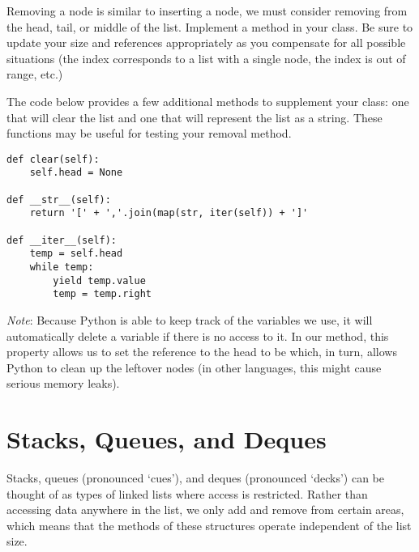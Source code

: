 \begin{problem}
Removing a node is similar to inserting a node, we must consider removing from the head, tail, or middle of the list.
Implement a  method in your  class.
Be sure to update your size and references appropriately as you compensate for all possible situations (the index corresponds to a list with a single node, the index is out of range, etc.)

The code below provides a few additional methods to supplement your  class: one that will clear the list and one that will represent the list as a string.
These functions may be useful for testing your removal method.
\begin{lstlisting}
def clear(self):
    self.head = None

def __str__(self):
    return '[' + ','.join(map(str, iter(self)) + ']'
    
def __iter__(self):
    temp = self.head
    while temp:
        yield temp.value
        temp = temp.right
\end{lstlisting}
\emph{Note}: Because Python is able to keep track of the variables we use, it will automatically delete a variable if there is no access to it.
In our  method, this property allows us to set the reference to the head to be  which, in turn, allows Python to clean up the leftover nodes (in other languages, this might cause serious memory leaks).
\label{prob:LinkedList}
\end{problem}

\section*{Stacks, Queues, and Deques}
Stacks, queues (pronounced `cues'), and deques (pronounced `decks') can be thought of as types of linked lists where access is restricted.
Rather than accessing data anywhere in the list, we only add and remove from certain areas, which means that the methods of these structures operate independent of the list size.

